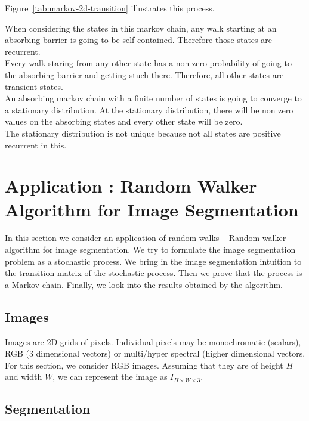 \documentclass[a4paper]{article}
\newcommand\figref{Figure~\ref}
\begin{document}
\figref{tab:markov-2d-transition} illustrates this process. 

When considering the states in this markov chain, any walk starting at an absorbing barrier is going to be self contained. Therefore those states are recurrent.\\

Every walk staring from any other state has a non zero probability of going to the absorbing barrier and getting stuch there. Therefore, all other states are transient states.\\

An absorbing markov chain with a finite number of states is going to converge to a stationary distribution. At the stationary distribution, there will be non zero values on the absorbing states and every other state will be zero.\\

The stationary distribution is not unique because not all states are positive recurrent in this.



\section{Application : Random Walker Algorithm for Image Segmentation}

In this section we consider an application of random walks -- Random walker algorithm for image segmentation. We try to formulate the image segmentation problem as a stochastic process. We bring in the image segmentation intuition to the transition matrix of the stochastic process. Then we prove that the process is a Markov chain. Finally, we look into the results obtained by the algorithm.

\subsection{Images}

Images are 2D grids of pixels. Individual pixels may be monochromatic (scalars), RGB (3 dimensional vectors) or multi/hyper spectral (higher dimensional vectors. For this section, we consider RGB images. Assuming that they are of height $H$ and width $W$, we can represent the image as $I_{H\times W\times 3}$.

\subsection{Segmentation}
\end{document}
